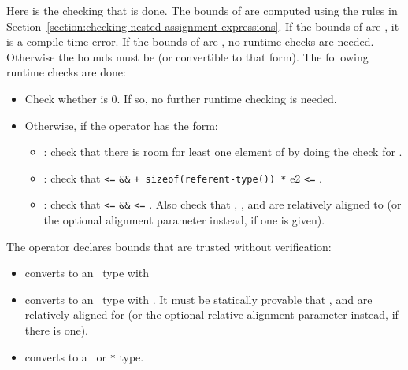 Here is the checking that is done. The bounds of  are computed
using the rules in Section~\ref{section:checking-nested-assignment-expressions}.
If the bounds of  are \boundsunknown, it is a compile-time error. 
If the bounds of  are \boundsany, no runtime checks are needed.
Otherwise the bounds must be  (or convertible to that form).
The following runtime checks are done:
\begin{itemize}
\item Check whether  is 0.  If so, no further runtime checking
is needed.
\item Otherwise, if the operator has the form:
\begin{itemize}
\item
  :
  check that there is room for least one element of  by doing
  the check for .
\item
  :
   check that 
  \texttt{<=}  \texttt{\&\&}  \texttt{+
  sizeof(referent-type(}\texttt{)) *} e2 \texttt{<=}
  .
\item
  : 
  check that  \texttt{<=}  \texttt{\&\&}
   \texttt{<=} . Also check that , , and  
  are relatively aligned to  (or the optional alignment parameter instead, if one
  is given). 

\end{itemize}
\end{itemize}

The operator  declares bounds that are trusted
without verification:
\begin{itemize}
\item
  converts  to an \arrayptr\ type with 
\item
  converts  to an
  \arrayptr\ type with .
  It must be statically provable that ,  and 
  are relatively aligned for  (or the optional
  relative alignment parameter instead, if there is one).
\item
  converts  to a \ptr\ or \texttt{*} type.
\end{itemize}

